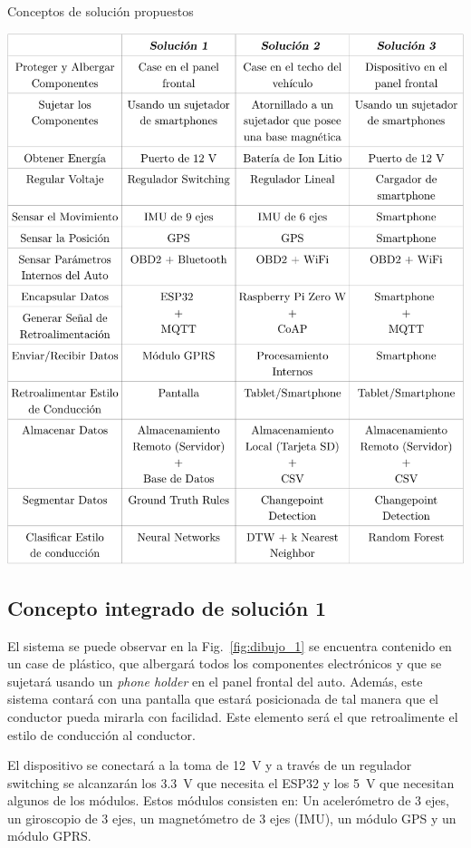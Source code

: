 \begin{table}[htbp!]
  \centering
  \caption{Conceptos de solución propuestos}
  \label{diag:resumen}
  \includegraphics[width=0.9\linewidth]{mat_resumen.pdf}
\end{table}
\newpage

\subsection{Concepto integrado de solución 1}
El sistema se puede observar en la Fig.~\ref{fig:dibujo_1} se encuentra contenido en un case de plástico, que albergará todos los componentes electrónicos y que se sujetará usando un {\it phone holder} en el panel frontal del auto. Además, este sistema contará con una pantalla que estará posicionada de tal manera que el conductor pueda mirarla con facilidad. Este elemento será el que retroalimente el estilo de conducción al conductor.

El dispositivo se conectará a la toma de \SI{12}{V} y a través de un regulador switching se alcanzarán los \SI{3.3}{V} que necesita el ESP32 y los \SI{5}{V} que necesitan algunos de los módulos.
Estos módulos consisten en: Un acelerómetro de 3 ejes, un giroscopio de 3 ejes, un magnetómetro de 3 ejes (IMU), un módulo GPS y un módulo GPRS.

